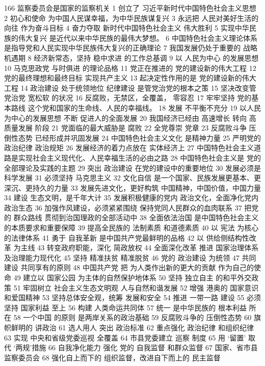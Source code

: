 \documentclass[11pt]{ctexart}
\begin{document}
166 监察委员会是国家的监察机关
1 创立了 习近平新时代中国特色社会主义思想
2 初心和使命
为中国人民谋幸福，为中华民族谋复兴
3 永远把 人民对美好生活的向往 作为奋斗目标
4 奋力夺取 新时代中国特色社会主义 伟大胜利
5 实现中华民族的伟大复兴 是近代以来中华民族的最伟大梦想。
6 中国特色社会主义理论体系
是指导党和人民实现中华民族伟大复兴的正确理论
7 我国发展仍处于重要的 战略机遇期
8 经济新常态，坚持 稳中求进 的工作总基调
9 以 人民为中心 的发展思想
10 马克思政党 与时俱进 的理论品格
11 党正在推进的 党的建设新的伟大工程
12 党的最终理想和最终目标
实现共产主义
13 起决定性作用的是
党的建设新的伟大工程
14 政治建设 处于统领地位
纪律建设 是管党治党的根本之策
15 坚决改变管党治党 宽松软 的状况
16 反腐败，无禁区，全覆盖， 零容忍
17 牢牢坚持 党的基本路线 这个党和国家的生命线、人民的幸福线。
18 发展 不平衡不充分
19 以人民为中心的发展思想
不断 促进人的全面发展
20 我国经济已经由
高速增长 转向 高质量发展 阶段
21 党面临的最大威胁是 腐败
22 全党尊崇 党章
23 反腐败斗争 压倒性态势 已经形成并巩固发展
24 中国特色社会主义文化 是精神力量
25 严明党的 政治纪律 政治规矩
26 发展经济的着力点放在 实体经济上
27 中国特色社会主义道路是实现社会主义现代化、人民幸福生活的必由之路
28 中国特色社会主义是 党的全部理论及实践的主题
29 突出 政治建设 在党的建设中的重要地位
30 发展必须是 科学发展
31 必须坚持 马克思主义
32 文化自信 是一个国家、民族发展更基本、更深沉、更持久的力量
33 发展先进文化，更好构筑 中国精神，中国价值，中国力量
34 建设 生态文明，是千年大计
35 发展积极健康的党内 政治文化，全面净化党内 政治生态
36 加强作风建设，必须紧紧围绕 保持党同人民群众的血肉联系
37 把党的 群众路线 贯彻到治国理政的全部活动中
38 全面依法治国 是中国特色社会主义的本质要求和重要保障
39 提高全民族的 法制素质 和道德素质
40 以 宪法 为核心的法律体系
41 勇于 自我革新 是中国共产党最鲜明的品格
42 以 供给侧结构性改革 为主线
43 转变政府职能，深化 简政放权
44 全面深化改革 推进 国家治理体系及治理能力现代化
45 坚持 精准扶贫 精准脱贫
46 党的 政治建设 为统领
47 共同建设 共同享有的原则
48 中国共产党 把 为人类作出新的更大的贡献 作为自己的使命
49 建立以 国家公园 为主体的自然保护地体系
50 坚持 独立自主 的和平外交政策
51 牢固树立 社会主义生态文明观 人与自然和谐发展
52 增强 港奥的 国家意识 和爱国精神
53 坚持总体安全观，统筹 发展和安全
54 推进 一带一路 建设
55 必须坚持 国家利益 至上
56 构建 人类命运共同体
57 统一 是中华民族的 根本利益 所在
58 一个中国 的原则 是两岸关系的政治基础
59 反腐败斗争的 压倒性态势
60 旗帜鲜明的 讲政治
61 选人用人 突出 政治标准
62 重点强化 政治纪律 和组织纪律
63 实现 中央和省级党委巡视 全覆盖
64 市县党委建立 巡察 制度
65 用 ‘留置’ 取代 ‘两规’措施
66 自我净化能力 强化 党的 自我监督 和群众监督
67 国家、省市县 监察委员会
68 强化自上而下的 组织监督，改进自下而上的 民主监督
\end{document}
